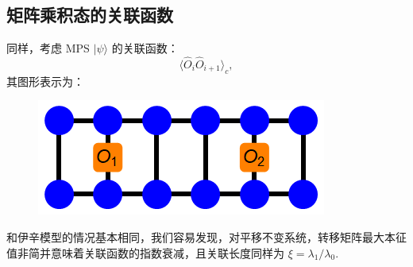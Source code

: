\documentclass[UTF8]{ctexart}
\begin{document}
\subsection*{矩阵乘积态的关联函数}
\noindent
同样，考虑 MPS $|\psi\rangle$ 的关联函数：
\begin{equation}
	\langle \hat{O}_i \hat{O}_{i+1} \rangle_c,
\end{equation}
其图形表示为：
\begin{figure}[H]
\begin{centering}
\includegraphics[width=0.5\linewidth]{include/mps-correlation}
\par\end{centering}
\end{figure}
\noindent 
和伊辛模型的情况基本相同，我们容易发现，对平移不变系统，转移矩阵最大本征值非简并意味着关联函数的指数衰减，且关联长度同样为 $\xi = \lambda_1/\lambda_0$.
\end{document}
